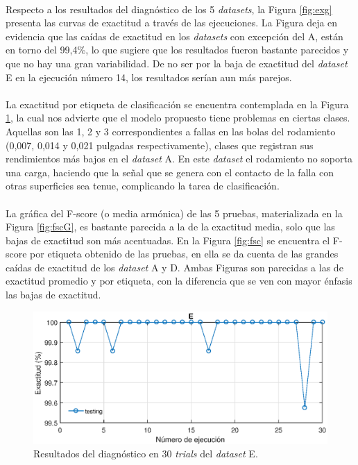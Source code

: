 \documentclass[a4paper,12pt]{article}
\begin{document}
\paragraph{}
Respecto a los resultados del diagnóstico de los 5 \textit{datasets}, la Figura \ref{fig:exg} presenta las curvas de exactitud a través de las ejecuciones. La Figura deja en evidencia que las caídas de exactitud en los \textit{datasets} con excepción del A, están en torno del 99,4\%, lo que sugiere que los resultados fueron bastante parecidos y que no hay una gran variabilidad. De no ser por la baja de exactitud del \textit{dataset} E en la ejecución número 14, los resultados serían aun más parejos.

\paragraph{}
La exactitud por etiqueta de clasificación se encuentra contemplada en la Figura \ref{fig:accge}, la cual nos advierte que el modelo propuesto tiene problemas en ciertas clases. Aquellas son las 1, 2 y 3 correspondientes a fallas en las bolas del rodamiento (0,007, 0,014 y 0,021 pulgadas respectivamente), clases que registran sus rendimientos más bajos en el \textit{dataset} A. En este \textit{dataset} el rodamiento no soporta una carga, haciendo que la señal que se genera con el contacto de la falla con otras superficies sea tenue, complicando la tarea de clasificación.

\paragraph{}
La gráfica del F-score (o media armónica) de las 5 pruebas, materializada en la Figura \ref{fig:fscG}, es bastante parecida a la de la exactitud media, solo que las bajas de exactitud son más acentuadas. En la Figura \ref{fig:fsc} se encuentra el F-score por etiqueta obtenido de las pruebas, en ella se da cuenta de las grandes caídas de exactitud de los \textit{dataset} A y D. Ambas Figuras son parecidas a las de exactitud promedio y por etiqueta, con la diferencia que se ven con mayor énfasis las bajas de exactitud. 


\begin{figure}[ht]
  \centering
    \includegraphics[scale=0.9]{./AccGE.eps}
  \caption{Resultados del diagnóstico en 30 \textit{trials} del \textit{dataset} E.}
  \label{fig:accge}
\end{figure}
\end{document}
